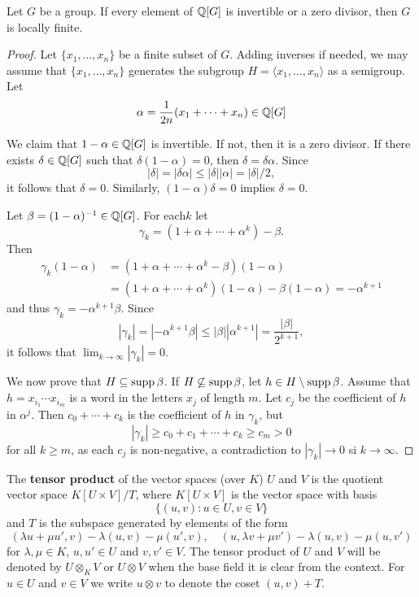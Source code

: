 \begin{theorem}[Formanek]
	\label{thm:FormanekQ}
	Let $G$ be a group. If every element of $\mathbb{Q}[G]$ is invertible or 
	a zero divisor, then $G$ is locally finite. 
\end{theorem}

\begin{proof}
	Let $\{x_1,\dots,x_n\}$ be a finite subset of $G$. Adding inverses if needed, we may assume that 
	$\{x_1,\dots,x_n\}$ generates the subgroup
	$H=\langle x_1,\dots,x_n\rangle$ as a semigroup. Let 
	\[
		\alpha=\frac{1}{2n}(x_1+\cdots+x_n)\in\mathbb{Q}[G]
	\]

	We claim that $1-\alpha\in\mathbb{Q}[G]$ is invertible. If not, then it is a zero divisor. If there exists 
	$\delta\in\mathbb{Q}[G]$ such that $\delta(1-\alpha)=0$, then 
	$\delta=\delta\alpha$. Since  
	\[
		|\delta|=|\delta\alpha|\leq|\delta||\alpha|=|\delta|/2,
	\]
	it follows that $\delta=0$. Similarly, $(1-\alpha)\delta=0$ implies
	$\delta=0$. 
	
	Let $\beta=(1-\alpha)^{-1}\in\mathbb{Q}[G]$.  For each$k$ let  
	\[
		\gamma_k=(1+\alpha+\cdots+\alpha^k)-\beta.
	\]
	Then 
	\begin{align*}
		\gamma_k(1-\alpha)&=(1+\alpha+\cdots+\alpha^k-\beta)(1-\alpha)\\
		&=(1+\alpha+\cdots+\alpha^k)(1-\alpha)-\beta(1-\alpha)=-\alpha^{k+1}
	\end{align*}
	and thus  
	$\gamma_k=-\alpha^{k+1}\beta$. Since  
	\[
		|\gamma_k|=|-\alpha^{k+1}\beta|\leq|\beta||\alpha^{k+1}|=\frac{|\beta|}{2^{k+1}},
	\]
	it follows that $\lim_{k\to\infty}|\gamma_k|=0$. 

	We now prove that $H\subseteq\operatorname{supp}\beta$. If
	$H\not\subseteq\operatorname{supp}\beta$, let $h\in H\setminus\operatorname{supp}\beta$.  Assume that 
    $h=x_{i_1}\cdots x_{i_m}$ is a word in the letters $x_j$ of length $m$. Let 
    $c_j$ be the coefficient of $h$ in $\alpha^j$. Then $c_0+\cdots+c_k$ is the 
	coefficient of $h$ in $\gamma_k$, but 
	\[
		|\gamma_k|\geq c_0+c_1+\cdots+c_k\geq c_m>0
	\]
	for all $k\geq m$, as each $c_j$ is non-negative, a contradiction to 
	$|\gamma_k|\to 0$ si $k\to\infty$.
\end{proof}


The \textbf{tensor product} of the vector spaces (over $K$) $U$ and $V$ 
is the quotient vector space $K[U\times V]/T$, where $K[U\times V]$ 
is the vector space with basis 
\[
\{(u,v):u\in U,v\in V\}
\]
and $T$ is the subspace 
generated by elements of the form 
\[
		(\lambda u+\mu u',v)-\lambda(u,v)-\mu(u',v),\quad
		(u,\lambda v+\mu v')-\lambda(u,v)-\mu(u,v')
	\]
for $\lambda,\mu\in K$, $u,u'\in U$ and $v,v'\in V$.
The tensor product of $U$ and $V$ will be denoted by $U\otimes_KV$ or 
$U\otimes V$ when the base field it is clear from the context. For $u\in U$ and 
$v\in V$ we write $u\otimes v$ to denote the coset $(u,v)+T$.

